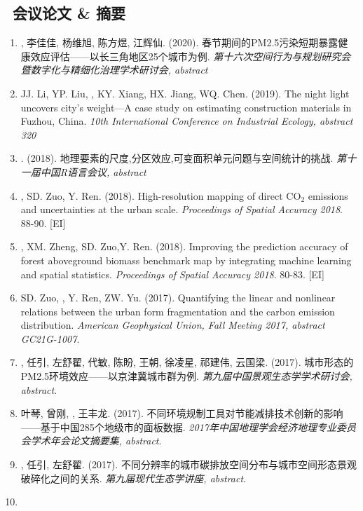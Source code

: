 \subsection*{\texorpdfstring{\faBook\ 会议论文 \& 摘要}{会议论文 \& 摘要}}
\begin{enumerate}
\item
    {}, 李佳佳, 杨维旭, 陈方煜, 江辉仙. (2020).
    春节期间的PM2.5污染短期暴露健康效应评估——以长三角地区25个城市为例.
    \textit{第十六次空间行为与规划研究会暨数字化与精细化治理学术研讨会, abstract}
\item
    JJ. Li, YP. Liu, \Shaoqing, KY. Xiang, HX. Jiang, WQ. Chen. (2019).
    The night light uncovers city's weight—A case study on estimating construction materials in Fuzhou, China.
    \textit{10th International Conference on Industrial Ecology, abstract 320}
\item
    {}. (2018).
    地理要素的尺度,分区效应,可变面积单元问题与空间统计的挑战.
    \textit{第十一届中国R语言会议, abstract}
\item
    \Shaoqing, SD. Zuo, Y. Ren. (2018).
    High-resolution mapping of direct CO$_2$ emissions and uncertainties at the urban scale.
    \textit{Proceedings of Spatial Accuracy 2018}. 88-90. [EI]
\item
    \Shaoqing\CF, XM. Zheng, SD. Zuo,Y. Ren. (2018).
    Improving the prediction accuracy of forest aboveground biomass benchmark map by integrating machine learning and spatial statistics.
    \textit{Proceedings of Spatial Accuracy 2018}. 80-83. [EI]
\item
    SD. Zuo, \Shaoqing, Y. Ren, ZW. Yu. (2017).
    Quantifying the linear and nonlinear relations between the urban form fragmentation and the carbon emission distribution.
    \textit{American Geophysical Union, Fall Meeting 2017, abstract GC21G-1007}.
\item
    {}, 任引, 左舒翟, 代敏, 陈盼, 王朝, 徐凌星, 祁建伟, 云国梁. (2017).
    城市形态的PM2.5环境效应——以京津冀城市群为例.
    \textit{第九届中国景观生态学学术研讨会, abstract}.
\item
    叶琴, 曾刚, {}, 王丰龙. (2017).
    不同环境规制工具对节能减排技术创新的影响——基于中国285个地级市的面板数据.
    \textit{2017年中国地理学会经济地理专业委员会学术年会论文摘要集, abstract}.
\item
    {}, 任引, 左舒翟. (2017).
    不同分辨率的城市碳排放空间分布与城市空间形态景观破碎化之间的关系.
    \textit{第九届现代生态学讲座, abstract}.
\item

\end{enumerate}
